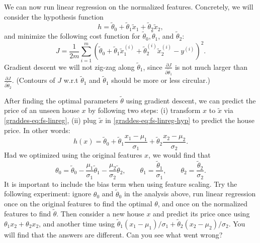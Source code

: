 \documentclass{article}
\theoremstyle{definition}
\begin{document}
We can now run linear regression on the normalized features. Concretely, we will consider the hypothesis function
\begin{equation}
    h=\tilde{\theta}_0+\tilde{\theta}_1\tilde{x}_1+\tilde{\theta}_2\tilde{x}_2,
    \label{graddes-eq:fs-linreg-hyp}
\end{equation}
and minimize the following cost function for $\tilde{\theta}_0, \tilde{\theta}_1$, and $\tilde{\theta}_2$:
\begin{equation}
    J=\frac{1}{2m}\sum_{i=1}^{m}(\tilde{\theta}_0+\tilde{\theta}_1\tilde{x}^{(i)}_1+\tilde{\theta}^{(i)}_2\tilde{x}^{(i)}_2-y^{(i)})^2.
\end{equation}
Gradient descent we will not zig-zag along $\tilde{\theta}_1$, since $\frac{\partial J}{\partial\tilde{\theta}_1}$ is not much larger than $\frac{\partial J}{\partial\tilde{\theta}_2}$. (Contours of $J$ w.r.t $\tilde{\theta}_1$ and $\tilde{\theta}_1$ should be more or less circular.)

After finding the optimal parameters $\tilde{\theta}$ using gradient descent, we can predict the price of an unseen house $x$ by following two steps: (i) transform $x$ to $\tilde{x}$ via \eqref{graddes-eq:fs-linreg}, (ii) plug $\tilde{x}$ in \eqref{graddes-eq:fs-linreg-hyp} to predict the house price. In other words:
\begin{equation}
    h(x)=\tilde{\theta}_0+\tilde{\theta}_1\frac{x_1 - \mu_1}{\sigma_1}+\tilde{\theta}_2\frac{x_2 - \mu_2}{\sigma_2}.
\end{equation}
Had we optimized using the original features $x$, we would find that
\begin{equation*}
    \theta_0 =\tilde{\theta}_0-\frac{\mu_1}{\sigma_1}\tilde{\theta}_1-\frac{\mu_2}{\sigma_2}\tilde{\theta}_2, \qquad
    \theta_1 = \frac{\tilde{\theta}_1}{\sigma_1}, \qquad
    \theta_2 = \frac{\tilde{\theta}_2}{\sigma_2}.
\end{equation*}
It is important to include the bias term when using feature scaling. Try the following experiment: ignore $\theta_0$ and $\tilde{\theta}_0$ in the analysis above, run linear regression once on the original features to find the optimal $\theta$, and once on the normalized features to find $\tilde{\theta}$. Then consider a new house $x$ and predict its price once using $\theta_1x_2+\theta_2x_2$, and another time using $\tilde{\theta}_1(x_1 - \mu_1)/\sigma_1+\tilde{\theta}_2(x_2 - \mu_2)/\sigma_2$. You will find that the answers are different. Can you see what went wrong?

\end{document}

